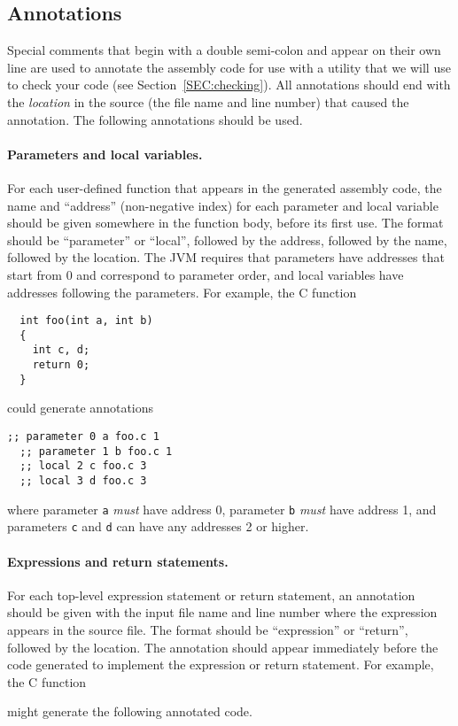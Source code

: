 \documentclass{article}
\begin{document}
\subsection{Annotations}
\label{SEC:annotations}

Special comments that begin with a double semi-colon
and appear on their own line
are used to annotate the assembly code
for use with a utility that we will use to check your code
  (see Section~\ref{SEC:checking}).
All annotations should end with the \emph{location}
in the source (the file name and line number)
that caused the annotation.
The following annotations should be used.

\paragraph{Parameters and local variables.}
For each user-defined function that appears in the generated assembly code,
the name and ``address''
(non-negative index) for each parameter and local variable
should be given
somewhere in the function body, before its first use.
The format should be
``parameter'' or ``local'',
followed by the address,
followed by the name,
followed by the location.
The JVM requires that parameters have addresses that start from 0 and
correspond to parameter order,
and local variables have addresses following the parameters.
For example, the C function
\begin{lstlisting}
  int foo(int a, int b)
  {
    int c, d;
    return 0;
  }
\end{lstlisting}
could generate annotations
\begin{lstlisting}[style=jvm]
  ;; parameter 0 a foo.c 1
  ;; parameter 1 b foo.c 1
  ;; local 2 c foo.c 3
  ;; local 3 d foo.c 3
\end{lstlisting}
where parameter {\tt a} \emph{must} have address 0,
parameter {\tt b} \emph{must} have address 1,
and parameters {\tt c} and {\tt d} can have any addresses 2 or higher.


\paragraph{Expressions and return statements.}
For each top-level expression statement or return statement,
an annotation should be given with the input file name and line number
where the expression appears in the source file.
The format should be
``expression'' or ``return'',
followed by the location.
The annotation should appear immediately before the code generated
to implement the expression or return statement.
For example, the C function

might generate the following annotated code.

\end{document}
